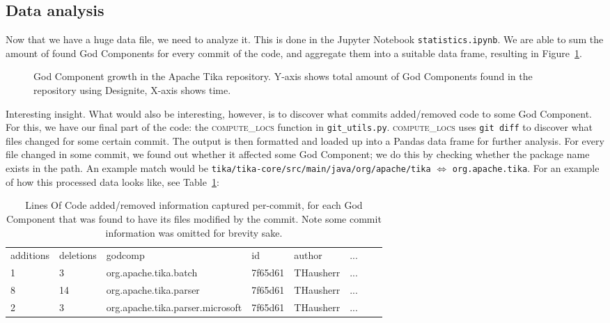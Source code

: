 \documentclass{article}
\begin{document}
\subsection{Data analysis}
Now that we have a huge data file, we need to analyze it. This is done in the Jupyter Notebook \texttt{statistics.ipynb}. We are able to sum the amount of found God Components for every commit of the code, and aggregate them into a suitable data frame, resulting in Figure~\ref{fig:designite/gcs-versus-time}.

\begin{figure}[ht]
    \centering
    
    \caption{God Component growth in the Apache Tika repository. Y-axis shows total amount of God Components found in the repository using Designite, X-axis shows time.}
    \label{fig:designite/gcs-versus-time}
\end{figure}

Interesting insight. What would also be interesting, however, is to discover what commits added/removed code to some God Component. For this, we have our final part of the code: the \textsc{compute\_locs} function in \texttt{git\_utils.py}. \textsc{compute\_locs} uses \texttt{git diff} to discover what files changed for some certain commit. The output is then formatted and loaded up into a Pandas data frame for further analysis. For every file changed in some commit, we found out whether it affected some God Component; we do this by checking whether the package name exists in the path. An example match would be \texttt{tika/tika-core/src/main/java/org/apache/tika} $\Leftrightarrow$ \texttt{org.apache.tika}. For an example of how this processed data looks like, see Table~\ref{tab:locs}:

\begin{table}[ht]
\begin{tabular}{llllllll}
additions & deletions & godcomp                          & id                                       & author    & ...\\
1         & 3         & org.apache.tika.batch            & 7f65d61 & THausherr & ... \\
8         & 14        & org.apache.tika.parser           & 7f65d61 & THausherr & ... \\
2         & 3         & org.apache.tika.parser.microsoft & 7f65d61 & THausherr & ... \\
\end{tabular}
\caption{Lines Of Code added/removed information captured per-commit, for each God Component that was found to have its files modified by the commit. Note some commit information was omitted for brevity sake.}
\label{tab:locs}
\end{table}
\end{document}
